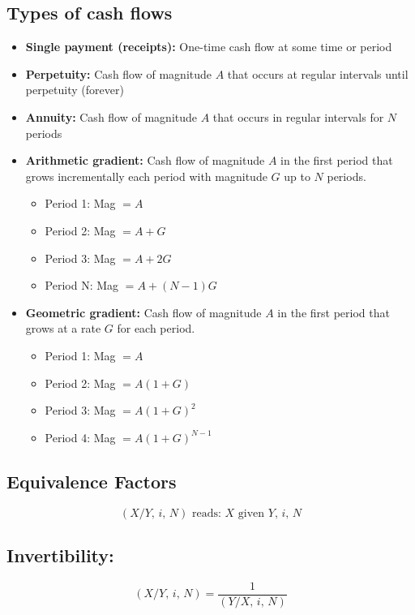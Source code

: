 \subsection{Types of cash flows}
\begin{definition}
    \begin{itemize}
        \item \textbf{Single payment (receipts):} One-time cash flow at some time or period
        \item \textbf{Perpetuity:} Cash flow of magnitude \(A\) that occurs at regular intervals until perpetuity (forever)
        \item \textbf{Annuity:} Cash flow of magnitude \(A\) that occurs in regular intervals for \(N\) periods
        \item \textbf{Arithmetic gradient:} Cash flow of magnitude \(A\) in the first period that grows incrementally each period with magnitude \(G\) up to \(N\) periods.
        \begin{itemize}
            \item Period 1: Mag \(= A\)
            \item Period 2: Mag \(= A + G\)
            \item Period 3: Mag \(= A + 2G\)
            \item Period N: Mag \(= A + (N - 1)G\)
        \end{itemize}
        \item \textbf{Geometric gradient:} Cash flow of magnitude \(A\) in the first period that grows at a rate \(G\) for each period.
        \begin{itemize}
            \item Period 1: Mag \(= A\) 
            \item Period 2: Mag \(= A(1+G)\)
            \item Period 3: Mag \(= A(1+G)^2\)
            \item Period 4: Mag \(= A(1+G)^{N-1}\)
        \end{itemize}
    \end{itemize}
\end{definition}

\subsection{Equivalence Factors}
\[
\left(X/Y, \, i, \, N\right) \text{ reads: } X \text{ given } Y, \, i, \, N
\]

\subsection{Invertibility:}
\begin{definition}
    \begin{equation}
        \left(X/Y, \, i, \, N\right) = \frac{1}{\left(Y/X, \, i, \, N\right)}
    \end{equation}
\end{definition}

